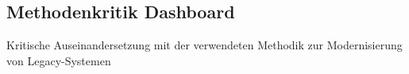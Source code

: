 \subsection{Methodenkritik Dashboard}
Kritische Auseinandersetzung mit der verwendeten Methodik zur Modernisierung von Legacy-Systemen